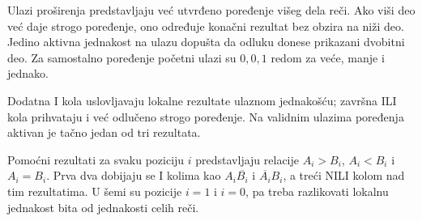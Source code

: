 Ulazi proširenja predstavljaju već utvrđeno poređenje višeg dela reči. Ako viši deo već daje strogo poređenje, ono određuje konačni rezultat bez obzira na niži deo. Jedino aktivna jednakost na ulazu dopušta da odluku donese prikazani dvobitni deo. Za samostalno poređenje početni ulazi su $0,0,1$ redom za veće, manje i jednako.

Dodatna I kola uslovljavaju lokalne rezultate ulaznom jednakošću; završna ILI kola prihvataju i već odlučeno strogo poređenje. Na validnim ulazima poređenja aktivan je tačno jedan od tri rezultata.

Pomoćni rezultati za svaku poziciju $i$ predstavljaju relacije $A_i>B_i$, $A_i<B_i$ i $A_i=B_i$. Prva dva dobijaju se I kolima kao $A_i\overline{B_i}$ i $\overline{A_i}B_i$, a treći NILI kolom nad tim rezultatima. U šemi su pozicije $i=1$ i $i=0$, pa treba razlikovati lokalnu jednakost bita od jednakosti celih reči.
